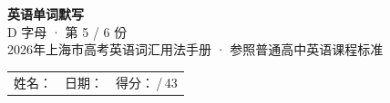 \documentclass[10pt,a4paper]{article}
\begin{document}
\pagestyle{plain}

\begin{center}
{\LARGE\bfseries 英语单词默写}\\[0.22em]
{\large D 字母 · 第 5 / 6 份}\\[0.18em]
{\small 2026年上海市高考英语词汇用法手册 · 参照普通高中英语课程标准}
\end{center}

\vspace{0.25em}
\noindent\begin{tabular}{@{}p{}@{}p{}@{}p{}@{}}
姓名：\underline{\hspace{2.0cm}} & 日期：\underline{\hspace{2.0cm}} & 得分：\underline{\hspace{1.3cm}}\,/\,43 \\
\end{tabular}

\vspace{0.3em}

\vspace{0.08em}
\end{document}
